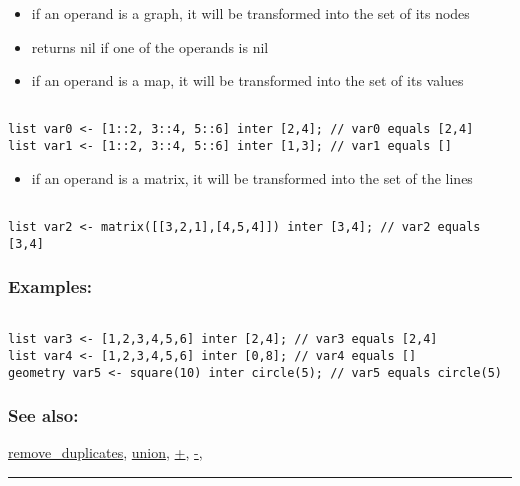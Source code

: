 \documentclass[]{book}
\providecommand{\tightlist}{%
  \setlength{\itemsep}{0pt}\setlength{\parskip}{0pt}}
\theoremstyle{definition}
\theoremstyle{definition}
\theoremstyle{definition}
\theoremstyle{remark}
\begin{document}
\begin{itemize}
\tightlist
\item
  if an operand is a graph, it will be transformed into the set of its
  nodes\\
\item
  returns nil if one of the operands is nil\\
\item
  if an operand is a map, it will be transformed into the set of its
  values
\end{itemize}

\begin{verbatim}
 
list var0 <- [1::2, 3::4, 5::6] inter [2,4]; // var0 equals [2,4] 
list var1 <- [1::2, 3::4, 5::6] inter [1,3]; // var1 equals []
\end{verbatim}

\begin{itemize}
\tightlist
\item
  if an operand is a matrix, it will be transformed into the set of the
  lines
\end{itemize}

\begin{verbatim}
 
list var2 <- matrix([[3,2,1],[4,5,4]]) inter [3,4]; // var2 equals [3,4]
\end{verbatim}

\subsubsection{Examples:}\label{examples-210}

\begin{verbatim}
 
list var3 <- [1,2,3,4,5,6] inter [2,4]; // var3 equals [2,4] 
list var4 <- [1,2,3,4,5,6] inter [0,8]; // var4 equals [] 
geometry var5 <- square(10) inter circle(5); // var5 equals circle(5)
\end{verbatim}

\subsubsection{See also:}\label{see-also-119}

\href{OperatorsNR\#remove_duplicates}{remove\_duplicates},
\href{OperatorsSZ\#union}{union}, \href{OperatorsAA\#+}{+},
\href{OperatorsAA\#-}{-},

\begin{center}\rule{0.5\linewidth}{\linethickness}\end{center}
\end{document}
